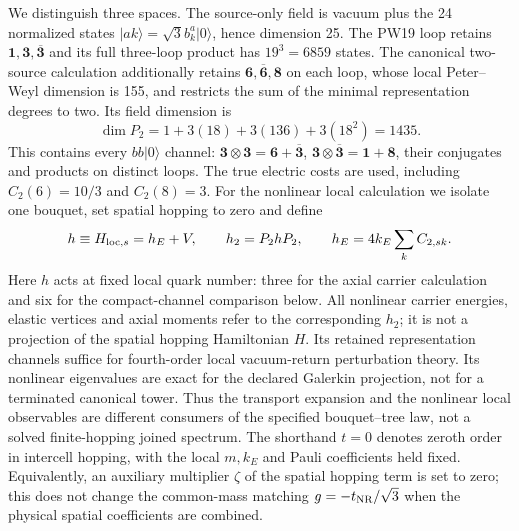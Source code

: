 \documentclass[11pt]{article}
\newcommand{\ket}[1]{\lvert #1\rangle}
\begin{document}
We distinguish three spaces. The source-only field is vacuum plus the 24 normalized states $\ket{ak}=\sqrt3 b_k^a\ket0$, hence dimension 25. The PW19 loop retains $\mathbf1,\mathbf3,\overline{\mathbf3}$ and its full three-loop product has $19^3=6859$ states. The canonical two-source calculation additionally retains $\mathbf6,\overline{\mathbf6},\mathbf8$ on each loop, whose local Peter--Weyl dimension is 155, and restricts the sum of the minimal representation degrees to two. Its field dimension is
\begin{equation}
 \dim P_2=1+3(18)+3(136)+3(18^2)=1435. \label{eq:dimension}
\end{equation}
This contains every $bb\ket0$ channel: $\mathbf3\otimes\mathbf3=\mathbf6+\overline{\mathbf3}$, $\mathbf3\otimes\overline{\mathbf3}=\mathbf1+\mathbf8$, their conjugates and products on distinct loops. The true electric costs are used, including $C_2(6)=10/3$ and $C_2(8)=3$. For the nonlinear local calculation we isolate one bouquet, set spatial hopping to zero and define
\begin{equation}
 h\equiv H_{{\rm loc},s}=h_E+V,\qquad h_2=P_2hP_2,\qquad
 h_E=4k_E\sum_k C_{2,sk}.
 \label{eq:localprojection}
\end{equation}
Here $h$ acts at fixed local quark number: three for the axial carrier calculation and six for the compact-channel comparison below. All nonlinear carrier energies, elastic vertices and axial moments refer to the corresponding $h_2$; it is not a projection of the spatial hopping Hamiltonian $H$. Its retained representation channels suffice for fourth-order local vacuum-return perturbation theory. Its nonlinear eigenvalues are exact for the declared Galerkin projection, not for a terminated canonical tower. Thus the transport expansion and the nonlinear local observables are different consumers of the specified bouquet--tree law, not a solved finite-hopping joined spectrum.
The shorthand $t=0$ denotes zeroth order in intercell hopping, with the local $m,k_E$ and Pauli coefficients held fixed. Equivalently, an auxiliary multiplier $\zeta$ of the spatial hopping term is set to zero; this does not change the common-mass matching $g=-t_{\rm NR}/\sqrt3$ when the physical spatial coefficients are combined.
\end{document}
